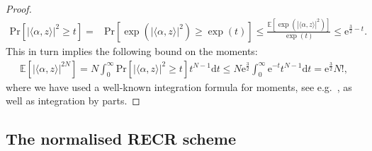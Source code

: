 \begin{proof}
\begin{align*}
  \mathrm{Pr} \left[ | \langle \alpha, z \rangle|^2 \geq t \right]
  =& \mathrm{Pr} \left[ \exp \left( | \langle  \alpha, z \rangle|^2 \right) \geq \exp \left( t \right) \right]
  \leq \frac{ \mathbb{E} \left[ \exp \left( | \langle \alpha,  z \rangle|^2 \right) \right]}{\exp (t)} \leq \mathrm{e}^{\frac{3}{2}-t}.
\end{align*}
This in turn implies the following bound on the moments:
\begin{align*}
  \mathbb{E} \left[ | \langle  \alpha, z \rangle|^{2N} \right]
  =  N \int_0^\infty \mathrm{Pr}\left[ | \langle  \alpha, z \rangle|^2\geq t \right] t^{N-1} \mathrm{d}t \leq N \mathrm{e}^{\frac{3}{2}} \int_0^\infty \mathrm{e}^{-t} t^{N-1} \mathrm{d}t
  = \mathrm{e}^{\frac{3}{2}} N!,
\end{align*}
where we have used a well-known integration formula for moments, see e.g.\ \cite[Prop.~7.1]{Foucart_2013_Mathematical}, as well as integration by parts.
\end{proof}


\subsection{The normalised RECR scheme}
\label{sub:pl.normalized_recr}


